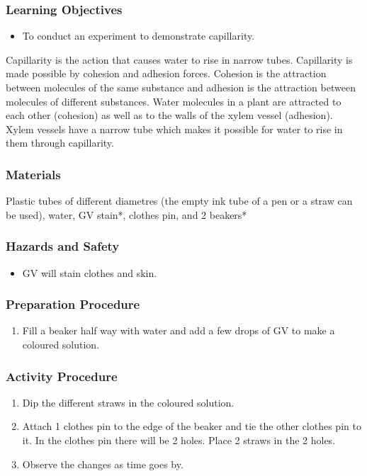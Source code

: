\subsubsection*{Learning Objectives}
\begin{itemize}
\item{To conduct an experiment to demonstrate capillarity.}
\end{itemize}


Capillarity is the action that causes water to rise in narrow tubes. Capillarity is made possible by cohesion and adhesion forces. Cohesion is the attraction between molecules of the same substance and adhesion is the attraction between  molecules of different substances. Water molecules in a plant are attracted to each other (cohesion) as well as to the walls of the xylem vessel (adhesion). Xylem vessels have a narrow tube which makes it possible for water to rise in them through capillarity.

\subsubsection*{Materials}
Plastic tubes of different diametres (the empty ink tube of a pen or a straw can be used), water, GV stain*, clothes pin, and 2 beakers*

\subsubsection*{Hazards and Safety}
\begin{itemize}
\item{GV will stain clothes and skin.}
\end{itemize}

\subsubsection*{Preparation Procedure}
\begin{enumerate}
\item{Fill a beaker half way with water and add a few drops of GV to make a coloured solution.}
\end{enumerate}

\subsubsection*{Activity Procedure}
\begin{enumerate}
\item{Dip the different straws in the coloured solution.}
\item{Attach 1 clothes pin to the edge of the beaker and tie the other clothes pin to it. In the clothes pin there will be 2 holes. Place 2 straws in the 2 holes.}
\item{Observe the changes as time goes by.}
\end{enumerate}

